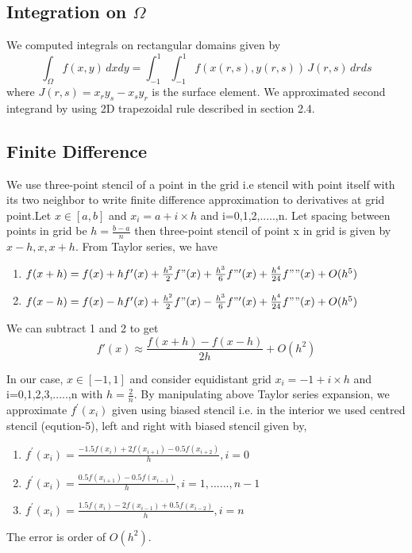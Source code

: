 \documentclass{article}
\begin{document}
\subsection{Integration on $\Omega$}
 We computed integrals on rectangular domains given by
\begin{equation}
    \int_\Omega f(x, y) \, dx dy
        = \int_{-1}^1 \int_{-1}^1 f(x(r, s), y(r, s)) \, J(r, s) \, dr ds 
\end{equation}
where $J(r,s) = x_ry_s - x_sy_r $ is the surface element. We approximated second integrand by using 2D trapezoidal rule described in section 2.4.

\subsection{Finite Difference}
We use three-point stencil of a point in the grid i.e stencil with point itself with its two neighbor to write finite difference approximation to derivatives at grid point.Let $x \in [a,b]$ and $x_i=a+i\times h$ and i=0,1,2,.....,n. Let spacing between points in grid be $h=\frac{b-a}{n}$ then three-point stencil of point x in grid is given by ${x-h,x,x+h}$. From Taylor series, we have 
\begin{enumerate}
    \item $f(x+h) = f(x)+hf'(x)+\frac{h^2}{2}f"(x)+\frac{h^3}{6}f"'(x)+\frac{h^4}{24}f""(x)+O(h^5)$
  \item $f(x-h) = f(x)-hf'(x)+\frac{h^2}{2}f"(x)-\frac{h^3}{6}f"'(x)+\frac{h^4}{24}f""(x)+O(h^5)$
\end{enumerate}
We can subtract 1 and 2 to get 
\begin{equation}
    f'(x) \approx \frac{f(x+h)-f(x-h)}{2h} + O(h^2)
\end{equation}

In our case, $x\in [-1,1]$ and consider equidistant grid $x_i=-1+i\times h$ and i=0,1,2,3,.....,n with $h=\frac{2}{n}$. By manipulating above Taylor series expansion, we approximate $f^{'}(x_i)$ given using biased stencil i.e. in the interior we used centred stencil (eqution-5), left and right with biased stencil given by,
\begin{enumerate}
    \item $f^{'}(x_i)= \frac{-1.5f(x_i)+2f(x_{i+1})-0.5f(x_{i+2})}{h},  i=0$
    \item $f^{'}(x_i)=\frac{0.5f(x_{i+1})-0.5f(x_{i-1})}{h},  i=1,......,n-1$
    \item $f^{'}(x_i) = \frac{1.5f(x_i)-2f(x_{i-1})+0.5f(x_{i-2})}{h},  i=n$
\end{enumerate}
The error is order of $O(h^2)$.
\end{document}
